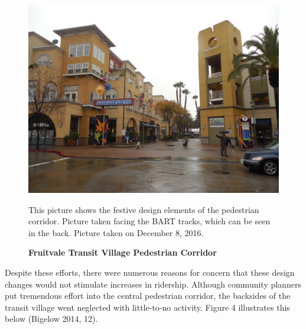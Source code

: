 \documentclass{article}
\begin{document}
\begin{figure}[H]
	\label{fig:Figure 3}
	\caption{\textbf{Fruitvale Transit Village Pedestrian Corridor}}
	\centering
	\begin{center}
	\includegraphics[width=0.9\linewidth]{fig3.jpg} 
	\end{center}
	\begin{minipage}{0.9\linewidth}
		{\par \footnotesize This picture shows the festive design elements of the pedestrian corridor. Picture taken facing the BART tracks, which can be seen in the back. Picture taken on December 8, 2016.\par}
	\end{minipage}
\end{figure}

\noindent
Despite these efforts, there were numerous reasons for concern that these design changes would not stimulate increases in ridership. Although community planners put tremendous effort into the central pedestrian corridor, the backsides of the transit village went neglected with little-to-no activity. Figure 4 illustrates this below (Bigelow 2014, 12). \\
\end{document}
